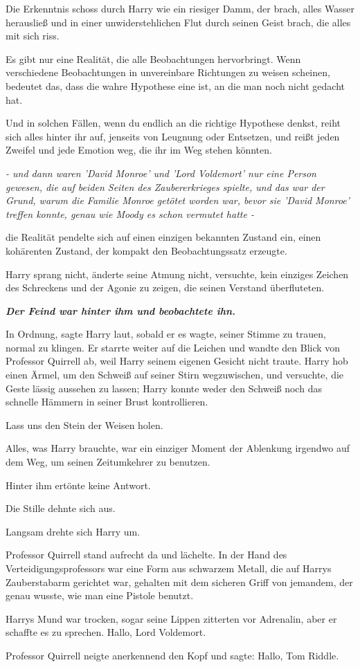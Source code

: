 Die Erkenntnis schoss durch Harry wie ein riesiger Damm, der brach, alles Wasser
herausließ und in einer unwiderstehlichen Flut durch seinen Geist brach, die
alles mit sich riss.

Es gibt nur eine Realität, die alle Beobachtungen hervorbringt. Wenn
verschiedene Beobachtungen in unvereinbare Richtungen zu weisen scheinen,
bedeutet das, dass die wahre Hypothese eine ist, an die man noch nicht gedacht
hat.

Und in solchen Fällen, wenn du endlich an die richtige Hypothese denkst, reiht
sich alles hinter ihr auf, jenseits von Leugnung oder Entsetzen, und reißt jeden
Zweifel und jede Emotion weg, die ihr im Weg stehen könnten.

\emph{- und dann waren 'David Monroe' und 'Lord Voldemort' nur eine Person
gewesen, die auf beiden Seiten des Zaubererkrieges spielte, und das war der
Grund, warum die Familie Monroe getötet worden war, bevor sie 'David Monroe'
treffen konnte, genau wie Moody es schon vermutet hatte -}

die Realität pendelte sich auf einen einzigen bekannten Zustand ein, einen
kohärenten Zustand, der kompakt den Beobachtungssatz erzeugte.

Harry sprang nicht, änderte seine Atmung nicht, versuchte, kein einziges Zeichen
des Schreckens und der Agonie zu zeigen, die seinen Verstand überfluteten.

\textbf{\emph{Der Feind war hinter ihm und beobachtete ihn.}}

\glqq{}In Ordnung\grqq{}, sagte Harry laut, sobald er es wagte, seiner Stimme zu
trauen, normal zu klingen. Er starrte weiter auf die Leichen und wandte den
Blick von Professor Quirrell ab, weil Harry seinem eigenen Gesicht nicht traute.
Harry hob einen Ärmel, um den Schweiß auf seiner Stirn wegzuwischen, und
versuchte, die Geste lässig aussehen zu lassen; Harry konnte weder den Schweiß
noch das schnelle Hämmern in seiner Brust kontrollieren.

\glqq{}Lass uns den Stein der Weisen holen.\grqq{}

Alles, was Harry brauchte, war ein einziger Moment der Ablenkung irgendwo auf
dem Weg, um seinen Zeitumkehrer zu benutzen.

Hinter ihm ertönte keine Antwort.

Die Stille dehnte sich aus.

Langsam drehte sich Harry um.

Professor Quirrell stand aufrecht da und lächelte. In der Hand des
Verteidigungsprofessors war eine Form aus schwarzem Metall, die auf Harrys
Zauberstabarm gerichtet war, gehalten mit dem sicheren Griff von jemandem, der
genau wusste, wie man eine Pistole benutzt.

Harrys Mund war trocken, sogar seine Lippen zitterten vor Adrenalin, aber er
schaffte es zu sprechen. \glqq{}Hallo, Lord Voldemort.\grqq{}

Professor Quirrell neigte anerkennend den Kopf und sagte: \glqq{}Hallo, Tom
Riddle.\grqq{}

